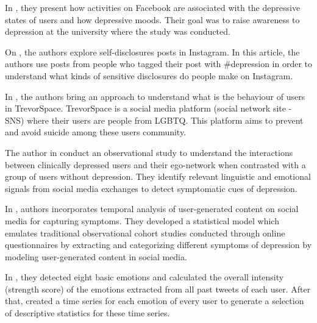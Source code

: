 In \cite{Park:2015:MDL:2675133.2675139}, they present how activities on Facebook are associated with the depressive states of users and how depressive moods.  Their goal was to raise awareness to depression at the university where the study was conducted.

On \cite{andalibi_sensitive_2017}, the authors explore self-disclosures posts in Instagram. In this article, the authors use posts from people who tagged their post with \#depression in order to understand what kinds of sensitive disclosures do people make on Instagram.

In \cite{Homan:2014:SSD:2531602.2531704}, %
the authors bring an approach to understand what is the behaviour of users in TrevorSpace. TrevorSpace is a social media platform (social network site - SNS) where their users are people from LGBTQ. This platform aims to prevent and avoid suicide among these users community.

The author in \cite{Vedula2017} conduct an observational study to understand the interactions between clinically depressed users and their ego-network when contrasted with a group of users without depression. They identify relevant linguistic and emotional signals from social media exchanges to detect symptomatic cues of depression.

In \cite{Yazdavar:2017:SAM:3110025.3123028}, authors incorporates temporal analysis of user-generated content on social media for capturing symptoms. They developed a statistical model which emulates traditional observational cohort studies conducted through online questionnaires by extracting and categorizing different symptoms of depression by modeling user-generated content in social media.

In \cite{Chen2018}, they detected eight basic emotions and calculated the overall intensity (strength score) of the emotions extracted from all past tweets of each user. After that, created a time series for each emotion of every user to generate a selection of descriptive statistics for these time series. 
